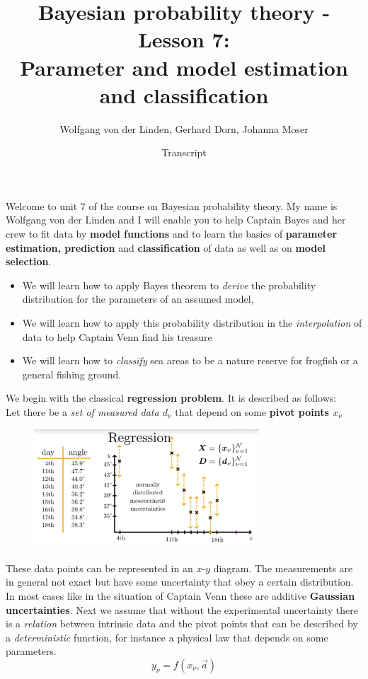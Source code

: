 \documentclass[12pt, a4paper]{scrartcl}
\title{Bayesian probability theory - Lesson 7:\\
Parameter and model estimation and classification}
\author{Wolfgang von der Linden, Gerhard Dorn, Johanna Moser}
\date{Transcript}
\begin{document}
\setlength{\parindent}{0pt}
\maketitle
\onehalfspacing

Welcome to unit 7 of the course on Bayesian probability theory. My
name is Wolfgang von der Linden and I will enable you to help Captain
Bayes and her crew to fit data by \textbf{model functions} and to learn the basics of
\textbf{parameter estimation, prediction} and \textbf{classification}
of data as well as on \textbf{model selection}.
\begin{itemize}\item We will learn how to apply Bayes theorem to \textit{derive} the probability
distribution for the parameters of an assumed model,
\item We will learn how to apply this probability distribution in the \textit{interpolation} 
of data to help Captain Venn find his treasure
\item We will learn how to \textit{classify} sea areas to be a nature reserve for
frogfish or a general fishing ground.
\end{itemize}


We begin with the classical \textbf{regression problem}. It is described as follows:\\
Let there be a \textit{set of measured data $d_{\nu}$} that depend on some \textbf{pivot points $x_{\nu}$}%
\begin{figure}[H]
	\centering
	\includegraphics[width=0.75\textwidth]{7_1.png}
\end{figure}
These data points can be represented in an $x$-$y$ diagram. 
The measurements are in general not exact but have some uncertainty that obey a certain distribution.
In most cases like in the situation of Captain Venn these
are additive \textbf{Gaussian uncertainties}.
Next we assume that without the experimental uncertainty there is a \textit{relation}
between intrinsic data and the pivot points that can be described by a
\textit{deterministic} function, for instance a physical law that depends on some parameters.\\
\[y_{\nu} = f(x_{\nu},\vec{a})\]
\end{document}
